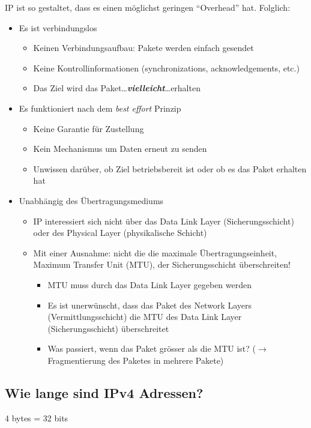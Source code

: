 IP ist so gestaltet, dass es einen möglichst geringen "`Overhead"' hat. Folglich:
\begin{itemize}
    \item Es ist verbindungslos
    \begin{itemize}
        \item Keinen Verbindungsaufbau: Pakete werden einfach gesendet
        \item Keine Kontrollinformationen (synchronizations, acknowledgements, etc.)
        \item Das Ziel wird das Paket\dots\textbf{\textsl{vielleicht}}\dots erhalten
    \end{itemize}
    \item Es funktioniert nach dem \textsl{best effort} Prinzip
    \begin{itemize}
        \item Keine Garantie für Zustellung
        \item Kein Mechanismus um Daten erneut zu senden
        \item Unwissen darüber, ob Ziel betriebsbereit ist oder ob es das Paket erhalten hat
    \end{itemize}
    \item Unabhängig des Übertragungsmediums
    \begin{itemize}
        \item IP interessiert sich nicht über das Data Link Layer (Sicherungsschicht) oder des Physical Layer (physikalische Schicht)
        \item Mit einer Ausnahme: nicht die die maximale Übertragungseinheit, Maximum Transfer Unit (MTU), der Sicherungsschicht überschreiten!
        \begin{itemize}
            \item MTU muss durch das Data Link Layer gegeben werden
            \item Es ist unerwünscht, dass das Paket des Network Layers (Vermittlungsschicht) die MTU des Data Link Layer (Sicherungsschicht) überschreitet
            \item Was passiert, wenn das Paket grösser als die MTU ist? ($\rightarrow$ Fragmentierung des Paketes in mehrere Pakete)
        \end{itemize}
    \end{itemize}
\end{itemize}

\subsection*{Wie lange sind IPv4 Adressen?}
4 bytes = 32 bits

